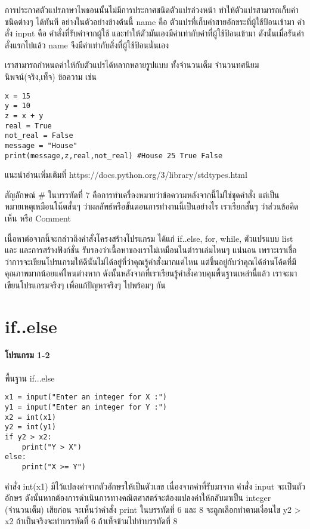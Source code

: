 \documentclass[17pt,fancychapters]{report}
\begin{document}
การประกาศตัวแปรภาษาไพธอนนั้นไม่มีการประกาศชนิดตัวแปรล่วงหน้า ทำให้ตัวแปรสามารถเก็บค่าชนิดต่างๆ ได้ทันที 
อย่างในตัวอย่างข้างต้นนี้ name คือ ตัวแปรที่เก็บค่าสายอักขระที่ผู้ใช้ป้อนเข้ามา คำสั่ง input คือ คำสั่งที่รับค่าจากผู้ใช้ และทำให้ตัวมันเองมีค่าเท่ากับค่าที่ผู้ใช้ป้อนเข้ามา ดังนั้นเมื่อรันคำสั่งแรกไปแล้ว name จึงมีค่าเท่ากับสิ่งที่ผู้ใช้ป้อนนั่นเอง

เราสามารถกำหนดค่าให้กับตัวแปรได้หลากหลายรูปแบบ ทั้งจำนวนเต็ม จำนวนทศนิยม นิพจน์(จริง,เท็จ) ข้อความ เช่น

\begin{lstlisting}[style=python]
x = 15
y = 10
z = x + y
real = True
not_real = False
message = "House"
print(message,z,real,not_real) #House 25 True False
\end{lstlisting}

แนะนำอ่านเพิ่มเติมที่ https://docs.python.org/3/library/stdtypes.html

สัญลักษณ์ \# ในบรรทัดที่ 7 คือการทำเครื่องหมายว่าข้อความหลังจากนี้ไม่ใช่ชุดคำสั่ง แต่เป็นหมายเหตุเหมือนโน๊ตสั้นๆ ว่าผลลัพธ์หรือขั้นตอนการทำงานนี้เป็นอย่างไร เราเรียกสั้นๆ ว่าส่วนข้อคิดเห็น หรือ Comment 

เนื้อหาต่อจากนี้จะกล่าวถึงคำสั่งโครงสร้างโปรแกรม ได้แก่ if..else, for, while, ตัวแปรแบบ list และ และการสร้างฟังก์ชั่น รับรองว่าเนื้อหาของเราไม่เหมือนในตำราเล่มไหนๆ แน่นอน เพราะเราเชื่อว่าการจะเขียนโปรแกรมให้ดีนั้นไม่ได้อยู่ที่ว่าคุณรู้คำสั่งมากแค่ไหน แต่ขึ้นอยู่กับว่าคุณได้อ่านโค้ดที่มีคุณภาพมากน้อยแค่ไหนต่างหาก ดังนั้นหลังจากที่เราเรียนรู้คำสั่งควบคุมพื้นฐานเหล่านี้แล้ว เราจะมาเขียนโปรแกรมจริงๆ เพื่อแก้ปัญหาจริงๆ ไปพร้อมๆ กัน

\section{if..else}

\paragraph{โปรแกรม 1-2} พื้นฐาน if...else
\begin{lstlisting}[style=python]
x1 = input("Enter an integer for X :")
y1 = input("Enter an integer for Y :")
x2 = int(x1)
y2 = int(y1)
if y2 > x2:
	print("Y > X")
else:
	print("X >= Y")
\end{lstlisting}

คำสั่ง int(x1) มีไว้แปลงค่าจากตัวอักษรให้เป็นตัวเลข เนื่องจากค่าที่รับมาจาก คำสั่ง input จะเป็นตัวอักษร ดังนั้นหากต้องการดำเนินการทางคณิตศาสตร์จะต้องแปลงค่าให้กลับมาเป็น integer (จำนวนเต็ม) เสียก่อน จะเห็นว่าคำสั่ง print ในบรรทัดที่ 6 และ 8 จะถูกเลือกทำตามเงื่อนไข y2 > x2 ถ้าเป็นจริงจะทำบรรทัดที่ 6 ถ้าเท็จข้ามไปทำบรรทัดที่ 8
\end{document}
